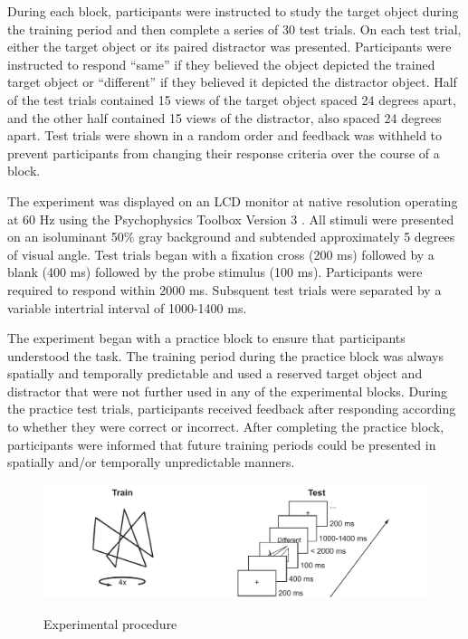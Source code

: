 \documentclass[dwyatte_dissertation.tex]{subfiles}
\begin{document}
During each block, participants were instructed to study the target object during the training period and then complete a series of 30 test trials. On each test trial, either the target object or its paired distractor was presented. Participants were instructed to respond ``same'' if they believed the object depicted the trained target object or ``different'' if they believed it depicted the distractor object. Half of the test trials contained 15 views of the target object spaced 24 degrees apart, and the other half contained 15 views of the distractor, also spaced 24 degrees apart. Test trials were shown in a random order and feedback was withheld to prevent participants from changing their response criteria over the course of a block. 

The experiment was displayed on an LCD monitor at native resolution operating at 60 Hz using the Psychophysics Toolbox Version 3 \cite{Brainard97,Pelli97}. All stimuli were presented on an isoluminant 50\% gray background and subtended approximately 5 degrees of visual angle. Test trials began with a fixation cross (200 ms) followed by a blank (400 ms) followed by the probe stimulus (100 ms). Participants were required to respond within 2000 ms. Subsquent test trials were separated by a variable intertrial interval of 1000-1400 ms.

The experiment began with a practice block to ensure that participants understood the task. The training period during the practice block was always spatially and temporally predictable and used a reserved target object and distractor that were not further used in any of the experimental blocks. During the practice test trials, participants received feedback after responding according to whether they were correct or incorrect. After completing the practice block, participants were informed that future training periods could be presented in spatially and/or temporally unpredictable manners.

\begin{figure}[h!]
\includegraphics[width=160mm]{figs/chap_bpleast/paperclip_task.pdf} \\
\caption{Experimental procedure}{}
\label{fig:bpleast_task}
\end{figure}
\end{document}
